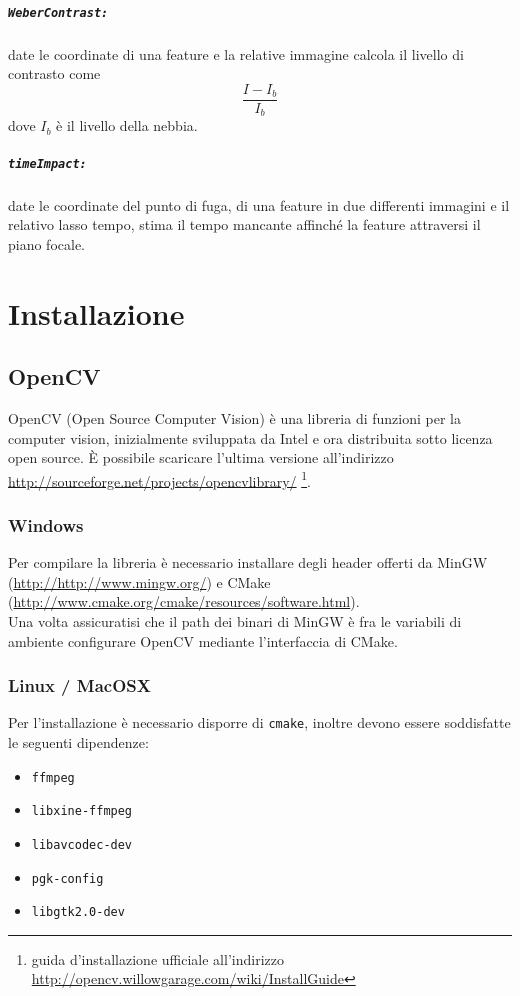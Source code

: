 \documentclass[12pt]{report}
\begin{document}
\paragraph*{\verb_WeberContrast:_} date le coordinate di una feature e la relative immagine calcola il livello di contrasto come $$\frac{I-I_b}{I_b}$$ dove $I_b$ \`e il livello della nebbia.

\paragraph*{\verb_timeImpact:_} date le coordinate del punto di fuga, di una feature in due differenti immagini e il relativo lasso tempo, stima il tempo mancante affinch\'e la feature attraversi il piano focale. %

\chapter{Installazione}
\section{OpenCV}
OpenCV (Open Source Computer Vision) \`e una libreria di funzioni per la computer vision, inizialmente sviluppata da Intel e ora distribuita sotto licenza open source. \`E possibile scaricare l'ultima versione all'indirizzo \url{http://sourceforge.net/projects/opencvlibrary/} \footnote{guida d'installazione ufficiale all'indirizzo \url{http://opencv.willowgarage.com/wiki/InstallGuide}}.

\subsection{Windows}
Per compilare la libreria \`e necessario installare degli header offerti da MinGW (\url{http://http://www.mingw.org/}) e CMake (\url{http://www.cmake.org/cmake/resources/software.html}).\\
\noindent Una volta assicuratisi che il path dei binari di MinGW \`e fra le variabili di ambiente configurare OpenCV mediante l'interfaccia di CMake.

\subsection{Linux / MacOSX}

\noindent Per l'installazione \`e necessario disporre di \verb|cmake|, inoltre devono essere soddisfatte le seguenti dipendenze:
\begin{itemize}
\item \verb|ffmpeg|
\item \verb|libxine-ffmpeg|
\item \verb|libavcodec-dev|
\item \verb|pgk-config|
\item \verb|libgtk2.0-dev|
\end{itemize}
\end{document}

